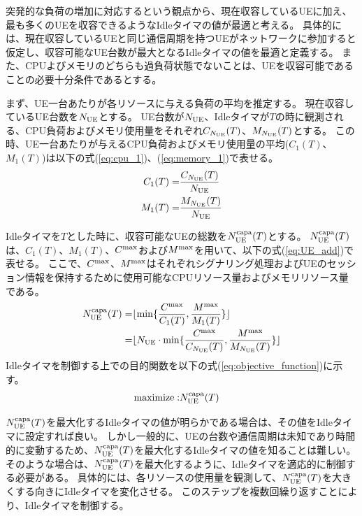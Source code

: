 \documentclass[a4j]{ujarticle}
\begin{document}
突発的な負荷の増加に対応するという観点から、現在収容しているUEに加え、最も多くのUEを収容できるようなIdleタイマの値が最適と考える。
具体的には、現在収容しているUEと同じ通信周期を持つUEがネットワークに参加すると仮定し、収容可能なUE台数が最大となるIdleタイマの値を最適と定義する。
また、CPUよびメモリのどちらも過負荷状態でないことは、UEを収容可能であることの必要十分条件であるとする。

まず、UE一台あたりが各リソースに与える負荷の平均を推定する。
現在収容しているUE台数を$N_{\rm UE}$とする。
UE台数が$N_{\rm UE}$、Idleタイマが$T$の時に観測される、CPU負荷およびメモリ使用量をそれぞれ$C_{N_{\rm UE}}(T)$、$M_{N_{\rm UE}}(T)$とする。
この時、UE一台あたりが与えるCPU負荷およびメモリ使用量の平均($C_{1}(T)$、$M_{1}(T)$)は以下の式(\ref{eq:cpu_1})、(\ref{eq:memory_1})で表せる。
\begin{eqnarray}
   C_{1}(T) =& \frac{C_{N_{\rm UE}}(T)}{N_{\rm UE}}\label{eq:cpu_1}\\
   M_{1}(T) =& \frac{M_{N_{\rm UE}}(T)}{N_{\rm UE}}\label{eq:memory_1}
\end{eqnarray}

Idleタイマを$T$とした時に、収容可能なUEの総数を$N_{\rm UE}^{\rm capa}(T)$とする。
$N_{\rm UE}^{\rm capa}(T)$は、$C_{1}(T)$、$M_{1}(T)$、$C^{\rm max}$および$M^{\rm max}$を用いて、以下の式(\ref{eq:UE_add})で表せる。
ここで、$C^{\rm max}$、$M^{\rm max}$はそれぞれシグナリング処理およびUEのセッション情報を保持するために使用可能なCPUリソース量およびメモリリソース量である。
\begin{eqnarray}
   N_{\rm UE}^{\rm capa}(T) =& \lfloor  \min \{\frac{C^{\rm max}}{C_{1}(T)},\frac{M^{\rm max}}{M_{1}(T)}\} \rfloor \nonumber\\
   =& \lfloor N_{\rm UE} \cdot \min \{\frac{C^{\rm max}}{C_{N_{\rm UE}}(T)}, \frac{M^{\rm max}}{M_{N_{\rm UE}}(T)}\} \rfloor\label{eq:UE_add}
\end{eqnarray}
Idleタイマを制御する上での目的関数を以下の式(\ref{eq:objective_function})に示す。
\begin{eqnarray}
  \text{maximize} :& N_{\rm UE}^{\rm capa}(T)
  \label{eq:objective_function}
\end{eqnarray}



$N_{\rm UE}^{\rm capa}(T)$を最大化するIdleタイマの値が明らかである場合は、その値をIdleタイマに設定すれば良い。
しかし一般的に、UEの台数や通信周期は未知であり時間的に変動するため、$N_{\rm UE}^{\rm capa}(T)$を最大化するIdleタイマの値を知ることは難しい。
そのような場合は、$N_{\rm UE}^{\rm capa}(T)$を最大化するように、Idleタイマを適応的に制御する必要がある。
具体的には、各リソースの使用量を観測して、$N_{\rm UE}^{\rm capa}(T)$を大きくする向きにIdleタイマを変化させる。
このステップを複数回繰り返すことにより、Idleタイマを制御する。
\end{document}
